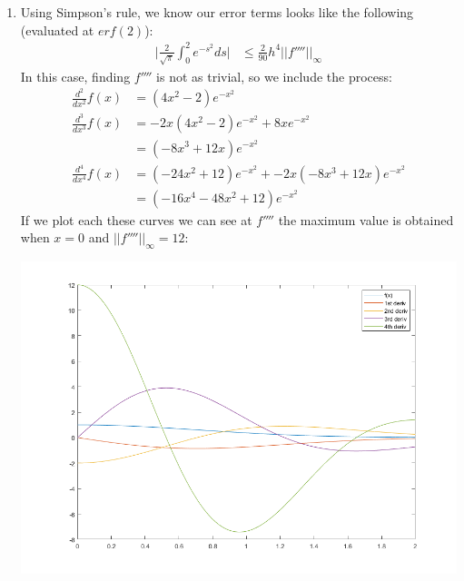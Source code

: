 \documentclass[11pt,a4paper]{article}
\begin{document}
\begin{itemize}
\begin{enumerate} [label={\alph*)}]
\begin{lstlisting}
						erf2 = 0.995322265;
						
						error = 1;
						n = 200000;
						while abs(error) > 10e-7
						% while n < 10
						h = x/n;
						%     fprintf('N = %d; Step size is %d; ',n, h);
						IT = (.5*exp(0) + .5*(1/exp((2)^2)));
						%     fprintf('Intermediate eval at ');
						for i = 1:n-1
						IT = IT + (1/ exp((i*h)^2));
						%         fprintf('x = %d; ',(i)*h);
						end
						IT = IT * h;
						error = erf2 - IT
						n = n+1;
						end
						end
						\end{lstlisting}
					\item Using Simpson's rule, we know our error terms looks like the following (evaluated at $erf(2)$):
					\begin{align*}
					\Biggl \vert \frac{2}{\sqrt{\pi}} \int_{0}^{2}e^{-s^2}ds \Biggl\vert &\leq \frac{2}{90}h^4 \vert \vert f'''' \vert \vert_\infty
					\end{align*}
					In this case, finding $f''''$ is not as trivial, so we include the process:
					\begin{align*}
						\frac{d^2}{dx^2}f(x) &= (4x^2-2)e^{-x^2} \\
						\frac{d^3}{dx^3}f(x) &= -2x(4x^2-2)e^{-x^2} + 8xe^{-x^2} \\
						 &= (-8x^3+12x)e^{-x^2} \\
						\frac{d^4}{dx^4}f(x) &= (-24x^2+12)e^{-x^2} + -2x(-8x^3+12x)e^{-x^2} \\
						&= (-16x^4 - 48x^2 +12)e^{-x^2} 
					\end{align*}
					If we plot each these curves we can see at $f''''$ the maximum value is obtained when $x=0$ and $\vert \vert f'''' \vert \vert_\infty = 12$:
					\begin{center}
						\includegraphics[width=1\linewidth]{ch6q8c}

\end{center}
\end{enumerate}
\end{itemize}
\end{document}
